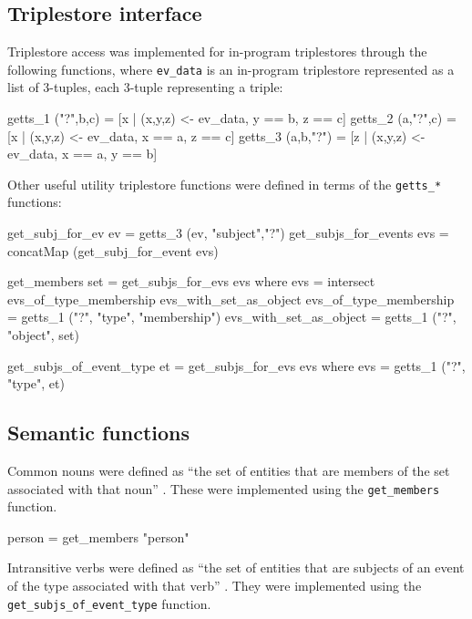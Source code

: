 \documentclass[../main.tex]{subfiles}
\begin{document}
\subsection{Triplestore interface}

Triplestore access was implemented for in-program triplestores through the following functions, where
\texttt{ev\_data} is an in-program triplestore represented as a list of 3-tuples, each 3-tuple representing a triple:

\begin{code}
  getts_1 ("?",b,c)   = [x | (x,y,z) <- ev_data, y == b, z == c]
  getts_2 (a,"?",c)   = [x | (x,y,z) <- ev_data, x == a, z == c]
  getts_3 (a,b,"?")   = [z | (x,y,z) <- ev_data, x == a, y == b]
\end{code}

Other useful utility triplestore functions were defined in terms of the \texttt{getts\_*}
functions:

\begin{code}
  get_subj_for_ev ev       = getts_3 (ev,  "subject","?")
  get_subjs_for_events evs = concatMap (get_subj_for_event evs)
	
  get_members set = get_subjs_for_evs evs
  where
    evs = intersect evs_of_type_membership evs_with_set_as_object
    evs_of_type_membership   = getts_1 ("?", "type", "membership")
    evs_with_set_as_object   = getts_1 ("?",  "object",  set)
		
  get_subjs_of_event_type et  = get_subjs_for_evs evs
  where
    evs = getts_1 ("?",  "type",  et)
\end{code}

\subsection{Semantic functions}

Common nouns were defined as ``the set of entities that are members of the set associated with that noun'' \cite{frost2014denotational}.
These were implemented using the \texttt{get\_members} function.

\begin{code}
	person = get_members "person"
\end{code}

Intransitive verbs were defined as ``the set of entities that are subjects of an event of the type associated with that verb'' \cite{frost2014denotational}.
They were implemented using the \texttt{get\_subjs\_of\_event\_type} function.
\end{document}
